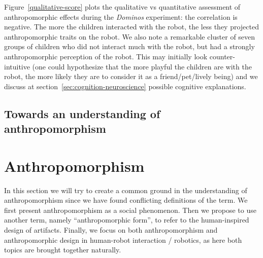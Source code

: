 \documentclass{frontiersSCNS} %
\begin{document}
Figure~\ref{qualitative-score} plots the qualitative vs quantitative assessment of
anthropomorphic effects during the \emph{Dominos} experiment: the correlation is
negative. The more the children interacted with the robot, the less they
projected anthropomorphic traits on the robot. We also note a remarkable cluster
of seven groups of children who did not interact much with the robot, but had a
strongly anthropomorphic perception of the robot. This may initially look
counter-intuitive (one could hypothesize that the more playful the children are
with the robot, the more likely they are to consider it as a friend/pet/lively
being) and we discuss at section~\ref{sec:cognition-neuroscience} possible
cognitive explanations.

\subsection{Towards an understanding of anthropomorphism}


%
%
%
%
%
%
%
%
%

\section{Anthropomorphism}
\label{sec:anthropomorphism}

In this section we will try to create a common ground in the understanding of anthropomorphism since we have found conflicting definitions of the term. We first present anthropomorphism as a social phenomenon. Then we propose to use another term, namely ``anthropomorphic form'', to refer to the human-inspired design of artifacts. Finally, we focus on both anthropomorphism and anthropomorphic design in human-robot interaction / robotics, as here both topics are brought together naturally. 
\end{document}

